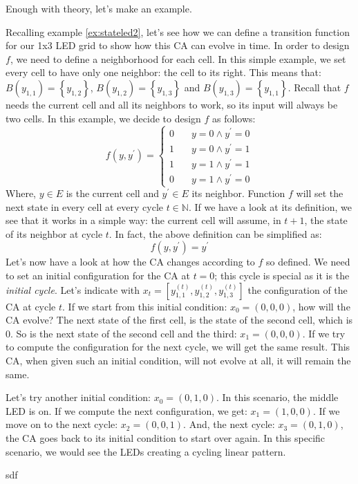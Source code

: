 Enough with theory, let's make an example.

\begin{example}
\label{ex:stateled3}
Recalling example \ref{ex:stateled2}, let's see how we can define a transition function for our
1x3 LED grid to show how this CA can evolve in time. In order to design $f$, we need to define
a neighborhood for each cell. In this simple example, we set every cell to have only one neighbor:
the cell to its right. This means that: $B\left( y_{1,1} \right) = \left\{ y_{1,2} \right\}$,
$B\left( y_{1,2} \right) = \left\{ y_{1,3} \right\}$ and 
$B\left( y_{1,3} \right) = \left\{ y_{1,1} \right\}$. Recall that $f$ needs the current cell
and all its neighbors to work, so its input will always be two cells.
In this example, we decide to design $f$ as follows:
\begin{equation*}
f \left( y, y^\prime \right) =
  \begin{cases}
    0       & \quad y = 0 \wedge y^\prime = 0\\
    1       & \quad y = 0 \wedge y^\prime = 1\\
    1       & \quad y = 1 \wedge y^\prime = 1\\
    0       & \quad y = 1 \wedge y^\prime = 0
  \end{cases}
\end{equation*}
Where, $y \in E$ is the current cell and $y^\prime \in E$ its neighbor.
Function $f$ will set the next state in every cell at every cycle $t \in \mathbb{N}$. If we have a look
at its definition, we see that it works in a simple way: the current cell will assume, in $t+1$, the state
of its neighbor at cycle $t$. In fact, the above definition can be simplified as:
\begin{equation*}
f \left( y, y^\prime \right) = y^\prime
\end{equation*}
Let's now have a look at how the CA changes according to $f$ so defined.
We need to set an initial configuration for the CA at $t=0$; this cycle is special as it is the
\textit{initial cycle}. Let's indicate with 
$x_t = \left[ y^{(t)}_{1,1}, y^{(t)}_{1,2}, y^{(t)}_{1,3} \right]$ the configuration of the CA
at cycle $t$. If we start from this initial condition:
$x_0 = (0,0,0)$, how will the CA evolve? The next state of the first cell, is the state of the second
cell, which is $0$. So is the next state of the second cell and the third: $x_1 = (0,0,0)$. If we try
to compute the configuration for the next cycle, we will get the same result. This CA, when given
such an initial condition, will not evolve at all, it will remain the same.

Let's try another initial condition: $x_0 = (0,1,0)$. In this scenario, the middle LED is on.
If we compute the next configuration, we get: $x_1 = (1,0,0)$. If we move on to the next cycle:
$x_2 = (0,0,1)$. And, the next cycle: $x_3 = (0,1,0)$, the CA goes back to its initial condition
to start over again. In this specific scenario, we would see the LEDs creating a cycling linear pattern.
\end{example}

sdf
